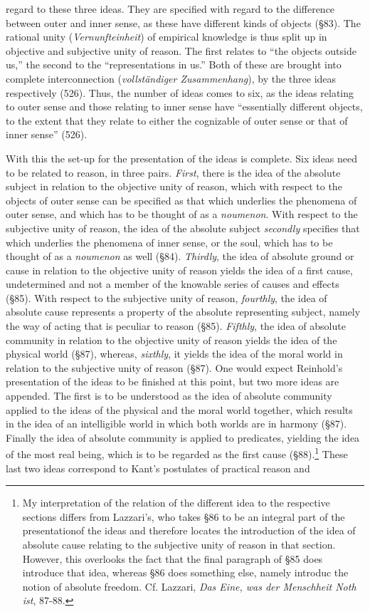 regard to these three ideas. They are specified with regard to the difference between outer and inner sense, as these have different kinds of objects (\S  83). The rational unity (\textit{Vernunfteinheit}) of empirical knowledge is thus split up in objective and subjective unity of reason. The first relates to ``the objects outside us,'' the second to the ``representations in us.'' Both of these are brought into complete interconnection (\textit{vollst\"{a}ndiger Zusammenhang}), by the three ideas respectively (526). Thus, the number of ideas comes to six, as the ideas relating to outer sense and those relating to inner sense have ``essentially different objects, to the extent that they relate to either the cognizable of outer sense or that of inner sense'' (526). 

 With this the set{-}up for the presentation of the ideas is complete. Six ideas need to be related to reason, in three pairs. \textit{First}, there is the idea of the absolute subject in relation to the objective unity of reason, which with respect to the objects of outer sense can be specified as that which underlies the phenomena of outer sense, and which has to be thought of as a \textit{noumenon}. With respect to the subjective unity of reason, the idea of the absolute subject \textit{secondly} specifies that which underlies the phenomena of inner sense, or the soul, which has to be thought of as a \textit{noumenon} as well (\S  84). \textit{Thirdly}, the idea of absolute ground or cause in relation to the objective unity of reason yields the idea of a first cause, undetermined and not a member of the knowable series of causes and effects (\S  85). With respect to the subjective unity of reason, \textit{fourthly}, the idea of absolute cause represents a property of the absolute representing subject, namely the way of acting that is peculiar to reason (\S 85). \textit{Fifthly}, the idea of absolute community in relation to the objective unity of reason yields the idea of the physical world (\S 87), whereas, \textit{sixthly}, it yields the idea of the moral world in relation to the subjective unity of reason (\S  87). One would expect Reinhold's presentation of the ideas to be finished at this point, but two more ideas are appended. The first is to be understood as the idea of absolute community applied to the ideas of the physical and the moral world together, which results in the idea of an intelligible world in which both worlds are in harmony (\S  87). Finally the idea of absolute community is applied to predicates, yielding the idea of the most real being, which is to be regarded as the first cause (\S  88).\footnote{ My interpretation of the relation of the different idea to the respective sections differs from Lazzari's, who takes \S  86 to be an integral part of the presentationof the ideas and therefore locates the introduction of the idea of absolute cause relating to the subjective unity of reason in that section. However, this overlooks the fact that the final paragraph of \S  85 does introduce that idea, whereas \S  86 does something else, namely introduc the notion of absolute freedom. Cf. Lazzari, \textit{Das Eine, was der Menschheit Noth ist}, 87{-}88.} These last two ideas correspond to Kant's postulates of practical reason and 